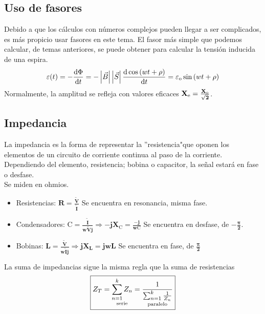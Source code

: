 \subsection{Uso de fasores}
 Debido a que los cálculos con números complejos pueden llegar a ser complicados, es más propicio usar fasores en este tema. El fasor más simple que podemos calcular, de temas anteriores, se puede obtener para calcular la tensión inducida de una espira.
\[
        \varepsilon (t) = -\frac{\mathrm{d} \Phi}{\mathrm{d} t} = -\left | \vec{B} \right |\left | \vec{S} \right |\frac{\mathrm{d} \cos{(wt+\rho )}}{\mathrm{d} t} = \varepsilon_{\textnormal{o}}\sin{(wt + \rho)}
\]
 Normalmente, la amplitud se refleja con valores eficaces \(\mathbf{X_{\textnormal{e}} = \frac{X_{\textnormal{o}}}{\sqrt{2}}}\).
\subsection{Impedancia}
 La impedancia es la forma de representar la ''resistencia"\space que oponen los elementos de un circuito de corriente continua al paso de la corriente.\\
Dependiendo del elemento, resistencia; bobina o capacitor, la señal estará en fase o desfase.\\ Se miden en ohmios.
\begin{itemize}
        \item Resistencias:
              \(\boxed{\mathbf{R = \frac{\tilde{V}}{\tilde{I}}}}\) Se encuentra en resonancia, misma fase.
        \item Condensadores:
              \(\boxed{\mathbf{\mathrm{C} = \frac{\tilde{I}}{w\tilde{V}j} \Rightarrow -jX_{\mathrm{C}} = \frac{-j}{w\mathrm{C}}}}\) Se encuentra en desfase, de \(\mathbf{-\frac{\pi}{2}}\).
        \item Bobinas:
              \(\boxed{\mathbf{L = \frac{\tilde{V}}{w\tilde{I}j} \Rightarrow jX_L =jwL}}\) Se encuentra en fase, de \(\mathbf{\frac{\pi}{2}}\)
\end{itemize}
La suma de impedancias sigue la misma regla que la suma de resistencias \[
        \boxed{Z_T = \underset{\textnormal{serie}}{\sum_{n=1}^{k} Z_n} = \underset{\textnormal{paralelo}}{\frac{1}{\sum_{n=1}^{k}\frac{1}{Z_n}}}}
\]
